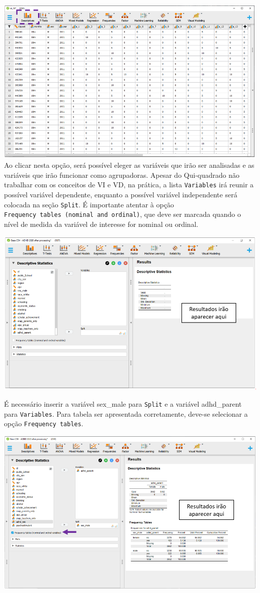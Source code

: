 \documentclass[
]{book}
\begin{document}
\includegraphics{./img/jasp_descriptives.png}
Ao clicar nesta opção, será possível eleger as variáveis que irão ser analisadas e as variáveis que irão funcionar como agrupadoras. Apesar do Qui-quadrado não trabalhar com os conceitos de VI e VD, na prática, a lista \texttt{Variables} irá reunir a possível variável dependente, enquanto a possível variável independente será colocada na seção \texttt{Split}. É importante atentar à opção \texttt{Frequency\ tables\ (nominal\ and\ ordinal)}, que deve ser marcada quando o nível de medida da variável de interesse for nominal ou ordinal.

\includegraphics{./img/cap_x2_primeira_tabela.png}

É necessário inserir a variável sex\_male para \texttt{Split} e a variável adhd\_parent para \texttt{Variables}. Para tabela ser apresentada corretamente, deve-se selecionar a opção \texttt{Frequency\ tables}.

\includegraphics{./img/cap_x2_descritivo.png}
\end{document}
